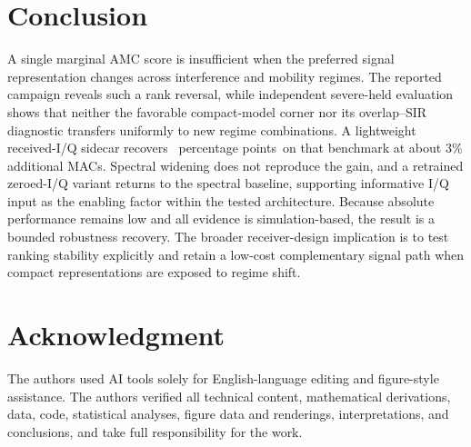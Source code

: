 \documentclass[letterpaper,journal]{IEEEtran}
\newcommand{\pp}{percentage points}
\begin{document}
\section{Conclusion}
A single marginal AMC score is insufficient when the preferred signal
representation changes across interference and mobility regimes. The reported
campaign reveals such a rank reversal, while independent severe-held
evaluation shows that neither the favorable compact-model corner nor its
overlap--SIR diagnostic transfers uniformly to new regime combinations. A
lightweight received-I/Q sidecar recovers \SevereRepairDiff\ \pp\ on that
benchmark at about 3\% additional MACs. Spectral widening does not reproduce
the gain, and a retrained zeroed-I/Q variant returns to the spectral baseline,
supporting informative I/Q input as the enabling factor within the tested
architecture. Because absolute performance remains low and all evidence is
simulation-based, the result is a bounded robustness recovery. The broader
receiver-design implication is to test ranking stability explicitly and retain
a low-cost complementary signal path when compact representations are exposed
to regime shift.

\section*{Acknowledgment}
The authors used AI tools solely for English-language editing and figure-style
assistance. The authors verified all technical content, mathematical
derivations, data, code, statistical analyses, figure data and renderings,
interpretations, and conclusions, and take full responsibility for the work.



\end{document}
